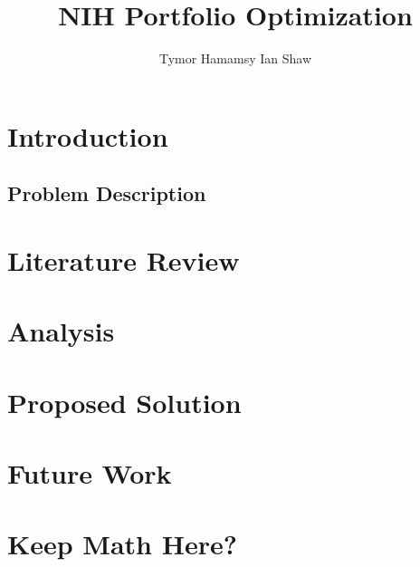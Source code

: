 \documentclass{article}
\title{NIH Portfolio Optimization}
\author{Tymor Hamamsy \quad Ian Shaw}
\begin{document}
\maketitle

\begin{abstract}

\end{abstract}


\newpage

\tableofcontents

\newpage

\section{Introduction}

\subsection{Problem Description}

\section{Literature Review}



\section{Analysis}

\section{Proposed Solution}

\section{Future Work}

\newpage

\appendix
\appendixpage
\addappheadtotoc

\section{Keep Math Here?}



\end{document}
